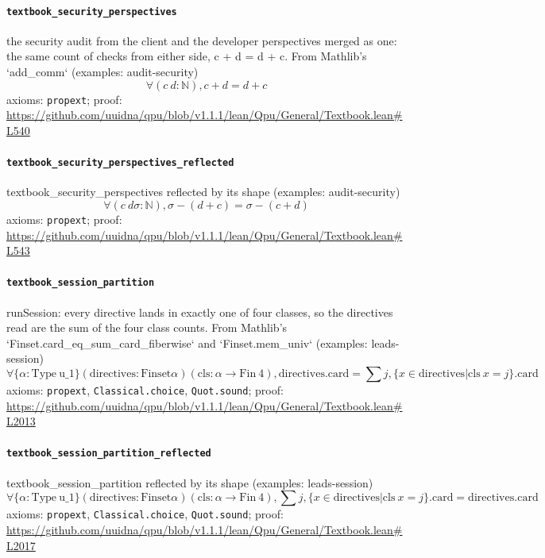 \documentclass[11pt]{article}
\begin{document}
\paragraph{\texttt{textbook\_security\_perspectives}}
the security audit from the client and the developer perspectives merged as one: the same count of checks from either side, c + d = d + c. From Mathlib's `add\_comm` (examples: audit-security)
\[ \forall (c\ d : \mathbb{N}), c + d = d + c \]
\noindent axioms: \texttt{propext}; proof: \url{https://github.com/uuidna/qpu/blob/v1.1.1/lean/Qpu/General/Textbook.lean\#L540}

\paragraph{\texttt{textbook\_security\_perspectives\_reflected}}
textbook\_security\_perspectives reflected by its shape (examples: audit-security)
\[ \forall (c\ d \sigma : \mathbb{N}), \sigma - (d + c) = \sigma - (c + d) \]
\noindent axioms: \texttt{propext}; proof: \url{https://github.com/uuidna/qpu/blob/v1.1.1/lean/Qpu/General/Textbook.lean\#L543}

\paragraph{\texttt{textbook\_session\_partition}}
runSession: every directive lands in exactly one of four classes, so the directives read are the sum of the four class counts. From Mathlib's `Finset.card\_eq\_sum\_card\_fiberwise` and `Finset.mem\_univ` (examples: leads-session)
\[ \forall \{\alpha : \mathrm{Type}\ \mathrm{u\_1}\} (\mathrm{directives} : \mathrm{Finset} \alpha ) (\mathrm{cls} : \alpha \to \mathrm{Fin}\ 4), \mathrm{directives.card} = \sum j, \{x \in \mathrm{directives} | \mathrm{cls}\ x = j\}\mathrm{.card} \]
\noindent axioms: \texttt{propext}, \texttt{Classical.choice}, \texttt{Quot.sound}; proof: \url{https://github.com/uuidna/qpu/blob/v1.1.1/lean/Qpu/General/Textbook.lean\#L2013}

\paragraph{\texttt{textbook\_session\_partition\_reflected}}
textbook\_session\_partition reflected by its shape (examples: leads-session)
\[ \forall \{\alpha : \mathrm{Type}\ \mathrm{u\_1}\} (\mathrm{directives} : \mathrm{Finset} \alpha ) (\mathrm{cls} : \alpha \to \mathrm{Fin}\ 4), \sum j, \{x \in \mathrm{directives} | \mathrm{cls}\ x = j\}\mathrm{.card} = \mathrm{directives.card} \]
\noindent axioms: \texttt{propext}, \texttt{Classical.choice}, \texttt{Quot.sound}; proof: \url{https://github.com/uuidna/qpu/blob/v1.1.1/lean/Qpu/General/Textbook.lean\#L2017}
\end{document}
